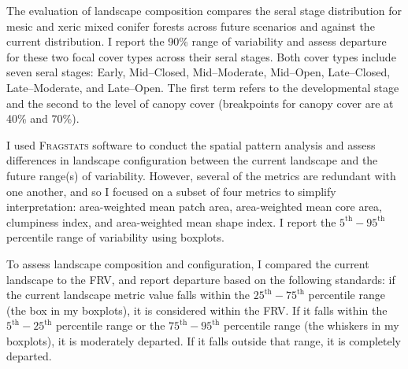 The evaluation of landscape composition compares the seral stage distribution for mesic and xeric mixed conifer forests across future scenarios and against the current distribution. I report the 90\% range of variability and assess departure for these two focal cover types across their seral stages. Both cover types include seven seral stages: Early, Mid--Closed, Mid--Moderate, Mid--Open, Late--Closed, Late--Moderate, and Late--Open. The first term refers to the developmental stage and the second to the level of canopy cover (breakpoints for canopy cover are at 40\% and 70\%).


%
I used \textsc{Fragstats} software \citep{Fragstats2012} to conduct the spatial pattern analysis and assess differences in landscape configuration between the current landscape and the future range(s) of variability. However, several of the metrics are redundant with one another, and so I focused on a subset of four metrics to simplify interpretation: area-weighted mean patch area, area-weighted mean core area, clumpiness index, and area-weighted mean shape index. I report the $5^{\text{th}}-95^{\text{th}}$ percentile range of variability using boxplots. %

To assess landscape composition and configuration, I compared the current landscape to the FRV, and report departure based on the following standards: if the current landscape metric value falls within the $25^{\text{th}}-75^{\text{th}}$ percentile range (the box in my boxplots), it is considered within the FRV. If it falls within the $5^{\text{th}}-25^{\text{th}}$ percentile range or the $75^{\text{th}}-95^{\text{th}}$ percentile range (the whiskers in my boxplots), it is moderately departed. If it falls outside that range, it is completely departed.



